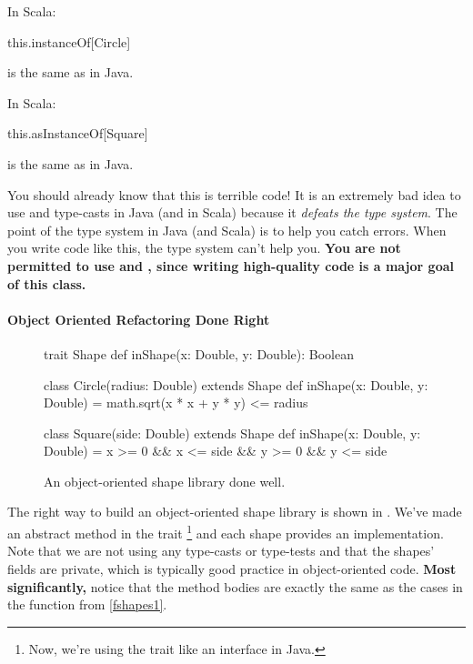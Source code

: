 \documentclass{book}
\begin{document}
\begin{notation}
In Scala:
\begin{scalacode}
this.instanceOf[Circle]
\end{scalacode}
is the same as
 in Java.

In Scala:
\begin{scalacode}
this.asInstanceOf[Square]
\end{scalacode}
is the same as  in Java.
\end{notation}

You should already know that this is terrible code! It is an extremely bad idea
to use  and type-casts in Java (and in Scala) because it
\emph{defeats the type system}. The point of the type system in Java (and Scala)
is to help you catch errors. When you write code like this, the type system
can't help you.
\textbf{You are not permitted to use  and ,
since writing high-quality code is a major goal of this class.}

\paragraph{Object Oriented Refactoring Done Right}

\begin{figure}
\begin{scalacode}
trait Shape {
  def inShape(x: Double, y: Double): Boolean
}

class Circle(radius: Double) extends Shape {
   def inShape(x: Double, y: Double) = math.sqrt(x * x + y * y) <= radius
}

class Square(side: Double) extends Shape {
  def inShape(x: Double, y: Double) = x >= 0 && x <= side && y >= 0 && y <= side
}
\end{scalacode}
\caption{An object-oriented shape library done well.}
\label{jshapes1}
\end{figure}

The right way to build an object-oriented shape library is shown in .
We've made
 an abstract method in the trait
\footnote{Now, we're using the trait like an interface
in Java.} and each shape provides
an implementation. Note that we are not using any type-casts or type-tests and
that the shapes' fields are private, which is typically good practice in
object-oriented code. \textbf{Most significantly,} notice that the method
bodies are exactly the same as the cases in the function from \cref{fshapes1}.
\end{document}
